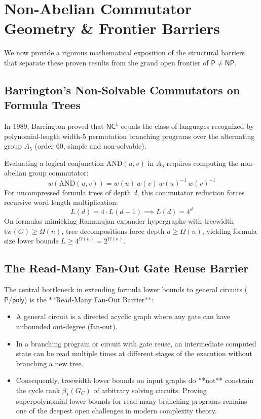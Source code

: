 \documentclass[11pt,a4paper]{article}
\theoremstyle{definition}
\theoremstyle{remark}
\newcommand{\NP}{\mathsf{NP}}
\newcommand{\PP}{\mathsf{P}}
\newcommand{\Ppoly}{\mathsf{P/poly}}
\newcommand{\NC}{\mathsf{NC}}
\begin{document}
\section{Non-Abelian Commutator Geometry \& Frontier Barriers}

We now provide a rigorous mathematical exposition of the structural barriers that separate these proven results from the grand open frontier of $\PP \neq \NP$.

\subsection{Barrington's Non-Solvable Commutators on Formula Trees}
In 1989, Barrington \cite{barrington89} proved that $\NC^1$ equals the class of languages recognized by polynomial-length width-5 permutation branching programs over the alternating group $A_5$ (order 60, simple and non-solvable).

Evaluating a logical conjunction $\mathrm{AND}(u, v)$ in $A_5$ requires computing the non-abelian group commutator:
\[
w(\mathrm{AND}(u, v)) = w(u) \, w(v) \, w(u)^{-1} \, w(v)^{-1}
\]
For uncompressed formula trees of depth $d$, this commutator reduction forces recursive word length multiplication:
\[
L(d) = 4 \cdot L(d-1) \implies L(d) = 4^d
\]
On formulas mimicking Ramanujan expander hypergraphs with treewidth $\mathrm{tw}(G) \ge \Omega(n)$, tree decompositions force depth $d \ge \Omega(n)$, yielding formula size lower bounds $L \ge 4^{\Omega(n)} = 2^{\Omega(n)}$.

\subsection{The Read-Many Fan-Out Gate Reuse Barrier}
The central bottleneck in extending formula lower bounds to general circuits ($\Ppoly$) is the **Read-Many Fan-Out Barrier**:
\begin{itemize}
    \item A general circuit is a directed acyclic graph where any gate can have unbounded out-degree (fan-out).
    \item In a branching program or circuit with gate reuse, an intermediate computed state can be read multiple times at different stages of the execution without branching a new tree.
    \item Consequently, treewidth lower bounds on input graphs do **not** constrain the cycle rank $\beta_1(G_C)$ of arbitrary solving circuits. Proving superpolynomial lower bounds for read-many branching programs remains one of the deepest open challenges in modern complexity theory.
\end{itemize}
\end{document}
